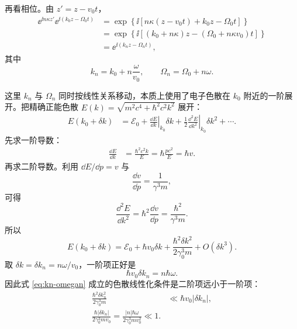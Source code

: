 再看相位。由 $z'=z-v_0t$，
\begin{align}
 \ee^{\ii n\kappa z'}\ee^{\ii(k_0z-\Omega_0t)}
 &=\exp\left\{\ii\left[n\kappa(z-v_0t)+k_0z-\Omega_0t\right]\right\}\\
 &=\exp\left\{\ii\left[(k_0+n\kappa)z-(\Omega_0+n\kappa v_0)t\right]\right\}\\
 &=\ee^{\ii(k_nz-\Omega_nt)},
\end{align}
其中
\begin{equation}
 \boxed{
 k_n=k_0+n\frac{\omega}{v_0},
 \qquad
 \Omega_n=\Omega_0+n\omega.}
 \label{eq:kn-omegan}
\end{equation}

这里 $k_n$ 与 $\Omega_n$ 同时按线性关系移动，本质上使用了电子色散在 $k_0$ 附近的一阶展开。把精确正能色散 $E(k)=\sqrt{m^2c^4+\hbar^2c^2k^2}$ 展开：
\begin{align}
 E(k_0+\delta k)
 &=\mathcal E_0
 +\left.\frac{\dd E}{\dd k}\right|_{k_0}\delta k
 +\frac12\left.\frac{\dd^2E}{\dd k^2}\right|_{k_0}\delta k^2+\cdots.
\end{align}
先求一阶导数：
\begin{align}
 \frac{\dd E}{\dd k}
 &=\frac{\hbar^2c^2k}{E}
 =\hbar\frac{pc^2}{E}
 =\hbar v.
\end{align}
再求二阶导数。利用 $\dd E/\dd p=v$ 与
\[
 \frac{\dd v}{\dd p}=\frac{1}{\gamma^3m},
\]
可得
\begin{equation}
 \frac{\dd^2E}{\dd k^2}
 =\hbar^2\frac{\dd v}{\dd p}
 =\frac{\hbar^2}{\gamma^3m}.
 \label{eq:Esecond}
\end{equation}
所以
\begin{equation}
 E(k_0+\delta k)
 =\mathcal E_0+\hbar v_0\delta k
 +\frac{\hbar^2\delta k^2}{2\gamma_0^3m}+O(\delta k^3).
 \label{eq:dispersion-taylor}
\end{equation}
取 $\delta k=\delta k_n=n\omega/v_0$，一阶项正好是
\[
 \hbar v_0\delta k_n=n\hbar\omega.
\]
因此式 \eqref{eq:kn-omegan} 成立的色散线性化条件是二阶项远小于一阶项：
\begin{align}
 \frac{\hbar^2\delta k_n^2}{2\gamma_0^3m}
 &\ll\hbar v_0|\delta k_n|,\\
 \boxed{
 \frac{\hbar|\delta k_n|}{2\gamma_0^3mv_0}
 =\frac{|n|\hbar\omega}{2\gamma_0^3mv_0^2}
 \ll1.}
 \label{eq:linear-dispersion-condition}
\end{align}


